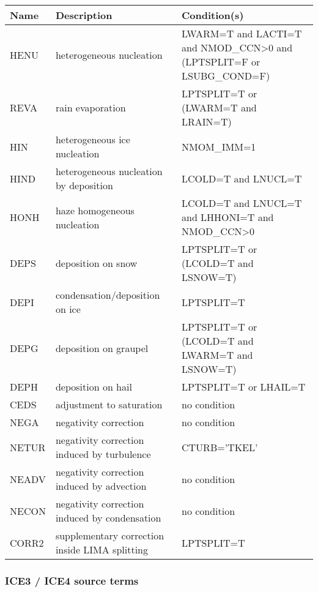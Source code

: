 \begin{longtable} {|p{}|p{}|p{}|}
\hline
Name & Description & Condition(s) \\
\hline \hline
\endhead
HENU   & heterogeneous nucleation                       & LWARM=T and LACTI=T and NMOD\_CCN>0 and (LPTSPLIT=F or LSUBG\_COND=F) \\\hline
REVA   & rain evaporation                               & LPTSPLIT=T or (LWARM=T and LRAIN=T) \\\hline
HIN    & heterogeneous ice nucleation                   & NMOM\_IMM=1 \\\hline
HIND   & heterogeneous nucleation by deposition         & LCOLD=T and LNUCL=T \\\hline
HONH   & haze homogeneous nucleation                    & LCOLD=T and LNUCL=T and LHHONI=T and NMOD\_CCN>0 \\\hline
DEPS   & deposition on snow                             & LPTSPLIT=T or (LCOLD=T and LSNOW=T) \\\hline
DEPI   & condensation/deposition on ice                 & LPTSPLIT=T \\\hline
DEPG   & deposition on graupel                          & LPTSPLIT=T or (LCOLD=T and LWARM=T and LSNOW=T) \\\hline
DEPH   & deposition on hail                             & LPTSPLIT=T or LHAIL=T \\\hline
CEDS   & adjustment to saturation                       & no condition \\\hline
NEGA   & negativity correction                          & no condition \\\hline
NETUR  & negativity correction induced by turbulence    & CTURB='TKEL' \\\hline
NEADV  & negativity correction induced by advection     & no condition \\\hline
NECON  & negativity correction induced by condensation  & no condition \\\hline
CORR2  & supplementary correction inside LIMA splitting & LPTSPLIT=T \\\hline
\end{longtable}

\subsubsection{ICE3 / ICE4 source terms}

